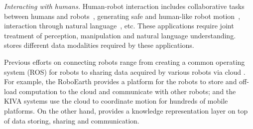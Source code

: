 \noindent
\emph{Interacting with humans.} Human-robot interaction includes collaborative tasks between humans and robots~\cite{NikolaidisISR10,nikolaidis2013human}, generating safe and human-like robot motion~\cite{Mainprice13,LasotaCASE14,GielniakIJRR13,DraganRSS13,CakmakIROS11}, interaction through natural language~\cite{TellexRSS14,misra2014tell}, etc. These applications require joint treatment of perception, manipulation and natural language understanding. \robobrain{} stores different data modalities required by these applications.
\iffalse
\noindent
\emph{Interacting with humans.} Another important aspect is
human-robot interaction. Previous works have focused on various aspects,
such as human-robot collaboration for task completion \cite{NikolaidisISR10, koppula-anticipatoryplanning-iser2014}, generating safe
robot motion near humans \cite{Mainprice13, LasotaCASE14},
 obeying user preferences \cite{CakmakIROS11},
 generating human like and legible motions \cite{GielniakIJRR13, DraganRSS13},
interaction through natural language \cite{TellexRSS14,misra2014tell}, etc.
These applications require joint treatment of perception, manipulation and natural language understanding.




\fi

Previous efforts on connecting robots range from creating a common operating system (ROS) for
 robots \cite{Quigley09}
to sharing data acquired by various robots via cloud \cite{RoboEarth, KIVA}.
For example, the RoboEarth \cite{RoboEarth} provides a platform for the robots to store and off-load computation
to the cloud and communicate with other robots; and the KIVA systems \cite{KIVA} use the cloud to coordinate motion for hundreds of mobile platforms. On the other hand, \robobrain{} provides a
knowledge representation layer on top of data storing, sharing and communication.

